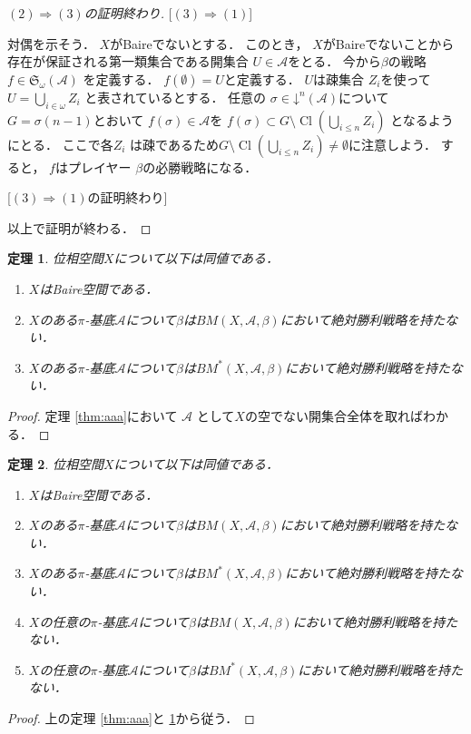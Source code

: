 \documentclass[leqno, 12pt]{jsarticle}
\newtheorem{thm}{定理}
\newcommand{\To}{\Longrightarrow}
\DeclareMathOperator{\cl}{Cl}
\newcommand{\mycal}[1]{\mathcal{#1}}
\newcommand{\mydn}[2]{\mathord{\downarrow}^{#1}(#2)}
\newcommand{\mysen}[2]{\mathfrak{S}_{#1}(#2)}
\newcommand{\myom}{\omega}
\begin{document}
\begin{proof}
[$(2)\To (3)$の証明終わり]

[$(3)\To (1)$]

対偶を示そう．
$X$がBaireでないとする．
このとき，
$X$がBaireでないことから存在が保証される第一類集合である開集合
$U\in \mycal{A}$をとる．
今から$\beta$の戦略$f\in \mysen{\myom}{\mycal{A}}$
を定義する．
$f(\emptyset)=U$と定義する．
$U$は疎集合
$Z_{i}$を使って
$U=\bigcup_{i\in \myom}Z_{i}$
と表されているとする．
任意の
$\sigma\in \mydn{n}{\mycal{A}}$について
$G=\sigma(n-1)$とおいて
$f(\sigma)\in \mycal{A}$を
$f(\sigma)\subset  G\setminus \cl(\bigcup_{i\le n}Z_{i})$
となるようにとる．
ここで各$Z_{i}$
は疎であるため$G\setminus \cl(\bigcup_{i\le n}Z_{i})\neq \emptyset$に注意しよう．
すると，
$f$はプレイヤー
$\beta$の必勝戦略になる．


[$(3)\To (1)$の証明終わり]

以上で証明が終わる．
\end{proof}


\begin{thm}\label{thm:bbb}
位相空間$X$について以下は同値である．
\begin{enumerate}
\item 
$X$はBaire空間である．
\item 
$X$のある$\pi$-基底$\mathcal{A}$について$\beta$は$BM(X, \mathcal{A}, \beta)$において絶対勝利戦略を持たない．
\item 
$X$のある$\pi$-基底$\mathcal{A}$について$\beta$は$BM^{*}(X, \mathcal{A}, \beta)$において絶対勝利戦略を持たない．
\end{enumerate}
\end{thm}

\begin{proof}
定理
\ref{thm:aaa}において
$\mathcal{A}$
として$X$の空でない開集合全体を取ればわかる．
\end{proof}

\begin{thm}
位相空間$X$について以下は同値である．
\begin{enumerate}
\item $X$はBaire空間である．
\item $X$のある$\pi$-基底$\mathcal{A}$について$\beta$は$BM(X, \mathcal{A}, \beta)$において絶対勝利戦略を持たない．
\item $X$のある$\pi$-基底$\mathcal{A}$について$\beta$は$BM^{*}(X, \mathcal{A}, \beta)$において絶対勝利戦略を持たない．
\item $X$の任意の$\pi$-基底$\mathcal{A}$について$\beta$は$BM(X, \mathcal{A}, \beta)$において絶対勝利戦略を持たない．
\item $X$の任意の$\pi$-基底$\mathcal{A}$について$\beta$は$BM^{*}(X, \mathcal{A}, \beta)$において絶対勝利戦略を持たない．
\end{enumerate}
\end{thm}
\begin{proof}
上の定理 \ref{thm:aaa}と
\ref{thm:bbb}から従う．
\end{proof}
\end{document}
